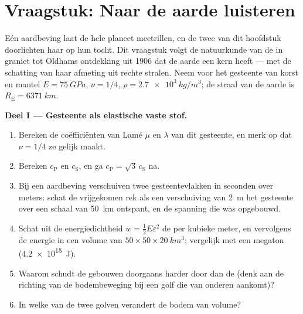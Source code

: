 \section{Vraagstuk: Naar de aarde luisteren}

\begin{problem}\label{pb:b3:continuum-elasticity:1}
Eén aardbeving laat de hele planeet meetrillen, en de twee  van dit hoofdstuk doorlichten haar op hun tocht. Dit vraagstuk
volgt de natuurkunde van de  in graniet tot Oldhams
ontdekking uit 1906 dat de aarde een kern heeft --- met de schatting van
haar afmeting uit rechte stralen. Neem voor het gesteente van korst en
mantel $E = \qty{75}{GPa}$, $\nu = 1/4$, $\rho = \qty{2.7e3}{kg/m^3}$;
de straal van de aarde is $R_{\text{E}} =
\qty{6371}{km}$.

\medskip\noindent\textbf{Deel I --- Gesteente als elastische vaste stof.}
\begin{enumerate}
  \item Bereken de coëfficiënten van Lamé $\mu$ en $\lambda$ van dit
        gesteente, en merk op dat $\nu = 1/4$ ze gelijk maakt.
  \item Bereken $c_{\text{P}}$ en $c_{\text{S}}$, en ga
        $c_{\text{P}} = \sqrt3\,c_{\text{S}}$ na.
  \item Bij een aardbeving verschuiven twee gesteentevlakken in
        seconden over meters: schat de vrijgekomen rek als een
        verschuiving van \qty{2}{m} het gesteente over een schaal van
        \qty{50}{km} ontspant, en de spanning die was opgebouwd.
  \item Schat uit de energiedichtheid $w = \tfrac12 E\varepsilon^2$ de
         per kubieke meter, en vervolgens de energie
        in een volume van $50 \times 50 \times \qty{20}{km^3}$;
        vergelijk met een megaton (\qty{4.2e15}{J}).
  \item Waarom schudt de  gebouwen doorgaans harder door dan de
         (denk aan de richting van de bodembeweging bij een golf
        die van onderen aankomt)?
  \item In welke van de twee golven verandert de bodem van volume?
\end{enumerate}


\end{problem}
